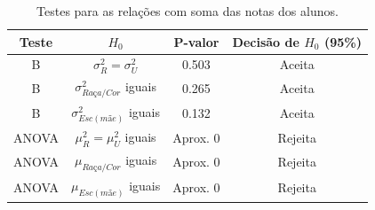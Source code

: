 \newpage
\begin{table}[htb]
\caption{Testes para as relações com soma
 das notas dos alunos.}
    \centering
    \begin{tabular}{cccc}
    \toprule
    Teste & $H_0$& P-valor & Decisão de $H_0$ (95\%)\\
    \midrule \midrule
    B & $\sigma_R^2 = \sigma_U^2$ & 0.503 & Aceita\\
    B & $\sigma_{Raça/Cor}^2$ iguais & 0.265 & Aceita\\
    B & $\sigma_{Esc(mãe)}^2$ iguais & 0.132 & Aceita\\
    ANOVA & $\mu_R^2 = \mu_U^2$ iguais & Aprox. 0 & Rejeita\\
    ANOVA & $\mu_{Raça/Cor}$ iguais & Aprox. 0 & Rejeita\\
    ANOVA & $\mu_{Esc(mãe)}$ iguais & Aprox. 0 & Rejeita\\
    \bottomrule
    \end{tabular}
\end{table}

